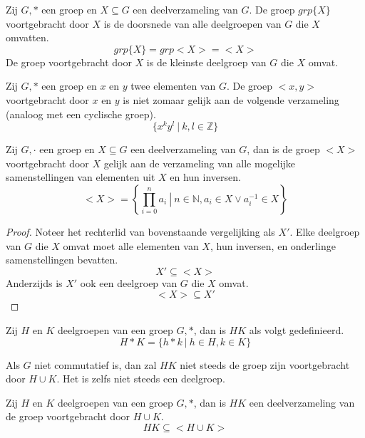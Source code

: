 \documentclass[main.tex]{subfiles}
\begin{document}
\begin{de}
  Zij $G,*$ een groep en $X \subseteq G$ een deelverzameling van $G$.
  De groep $grp\{X\}$ voortgebracht door $X$ is de doorsnede van alle deelgroepen van $G$ die $X$ omvatten. 
  \[ grp\{X\} = grp<X> = <X> \]
  De groep voortgebracht door $X$ is de kleinste deelgroep van $G$ die $X$ omvat.
\end{de}

\begin{opm}
  Zij $G,*$ een groep en $x$ en $y$ twee elementen van $G$.
  De groep $<x,y>$ voortgebracht door $x$ en $y$ is niet zomaar gelijk aan de volgende verzameling (analoog met een cyclische groep).
  \[ \{ x^{k}y^{l}\ |\ k,l\in \mathbb{Z} \} \]
\end{opm}

\begin{ei}
  Zij $G,\cdot$ een groep en $X \subseteq G$ een deelverzameling van $G$, dan is de groep $<X>$ voortgebracht door $X$ gelijk aan de verzameling van alle mogelijke samenstellingen van elementen uit $X$ en hun inversen.
  \[ <X> = \left\{ \prod_{i=0}^{n}a_{i} \ \left|\ n\in \mathbb{N}, a_{i}\in X \vee a_{i}^{-1} \in X \right.\right\}\]

  \begin{proof}
    Noteer het rechterlid van bovenstaande vergelijking als $X'$.
    Elke deelgroep van $G$ die $X$ omvat moet alle elementen van $X$, hun inversen, en onderlinge samenstellingen bevatten.
    \[ X' \subseteq <X> \]
    Anderzijds is $X'$ ook een deelgroep van $G$ die $X$ omvat.
\waarom
    \[ <X> \subseteq X' \]
  \end{proof}
\end{ei}


\begin{de}
  Zij $H$ en $K$ deelgroepen van een groep $G,*$, dan is $HK$ als volgt gedefinieerd.
  \[ H*K = \{ h*k\ |\ h\in H, k\in K \} \]
\end{de}

\begin{opm}
  \label{opm:verm-deelgroepen-niet-noodzakelijk-deelgroep}
  Als $G$ niet commutatief is, dan zal $HK$ niet steeds de groep zijn voortgebracht door $H\cup K$.
  Het is zelfs niet steeds een deelgroep.
\end{opm}

\begin{st}
  \label{st:verm-deelgroepen-deel-van-voortbrenging-van-unie}
  Zij $H$ en $K$ deelgroepen van een groep $G,*$, dan is $HK$ een deelverzameling van de groep voortgebracht door $H\cup K$.
  \[ HK \subseteq <H\cup K> \]
\end{st}
\end{document}
